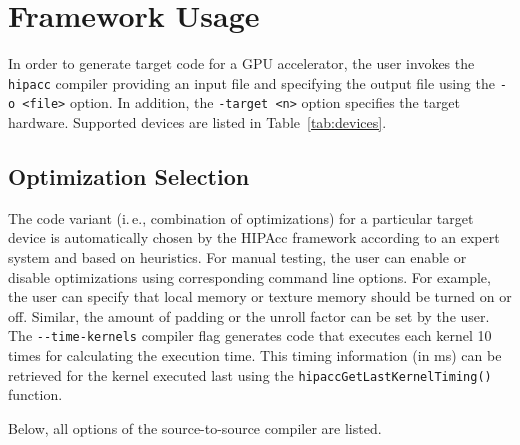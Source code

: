 \section{Framework Usage}
In order to generate target code for a \ac{GPU} accelerator, the user invokes the \verb|hipacc| compiler providing an input file and specifying the output file using the \verb|-o <file>| option.
In addition, the \verb|-target <n>| option specifies the target hardware. Supported devices are listed in Table~\ref{tab:devices}.

\subsection{Optimization Selection}
The code variant (i.\,e., combination of optimizations) for a particular target device is automatically chosen by the \ac{HIPAcc} framework according to an expert system and based on heuristics.
For manual testing, the user can enable or disable optimizations using corresponding command line options.
For example, the user can specify that local memory or texture memory should be turned on or off.
Similar, the amount of padding or the unroll factor can be set by the user.
The \verb|--time-kernels| compiler flag generates code that executes each kernel 10 times for calculating the execution time.
This timing information (in ms) can be retrieved for the kernel executed last using the \verb|hipaccGetLastKernelTiming()| function.

Below, all options of the source-to-source compiler are listed.

